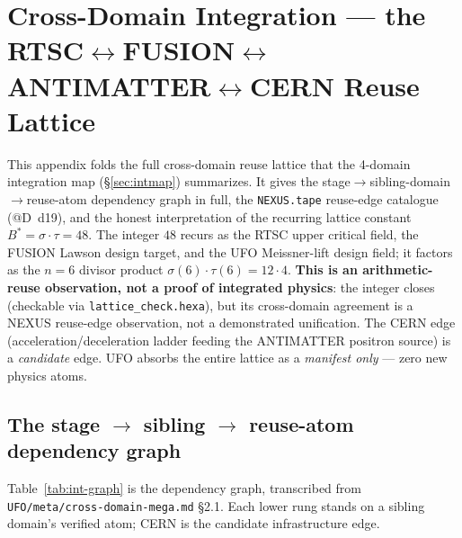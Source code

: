 \section{Cross-Domain Integration --- the RTSC$\leftrightarrow$FUSION$\leftrightarrow$ANTIMATTER$\leftrightarrow$CERN Reuse Lattice}
\label{app:integration}

This appendix folds the full cross-domain reuse lattice that the
4-domain integration map (\S\ref{sec:intmap}) summarizes. It gives the
stage$\to$sibling-domain$\to$reuse-atom dependency graph in full, the
\texttt{NEXUS.tape} reuse-edge catalogue (@D~d19), and the honest
interpretation of the recurring lattice constant
$B^{*}=\sigma\!\cdot\!\tau=48$. The integer $48$ recurs as the RTSC
upper critical field, the FUSION Lawson design target, and the UFO
Meissner-lift design field; it factors as the $n\!=\!6$ divisor product
$\sigma(6)\!\cdot\!\tau(6)=12\!\cdot\!4$. \textbf{This is an
arithmetic-reuse observation, not a proof of integrated physics}:
the integer closes (checkable via \texttt{lattice\_check.hexa}), but its
cross-domain agreement is a NEXUS reuse-edge observation, not a
demonstrated unification. The CERN edge (acceleration/deceleration
ladder feeding the ANTIMATTER positron source) is a \emph{candidate}
edge. UFO absorbs the entire lattice as a \emph{manifest only} --- zero
new physics atoms.

\subsection{The stage $\to$ sibling $\to$ reuse-atom dependency graph}
\label{app:int-graph}

Table~\ref{tab:int-graph} is the dependency graph, transcribed from
\texttt{UFO/meta/cross-domain-mega.md} \S2.1. Each lower rung stands on a
sibling domain's verified atom; CERN is the candidate infrastructure edge.

